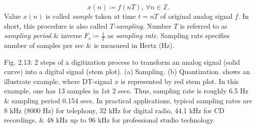 \documentclass{article}
\begin{document}
\begin{itemize}
\begin{itemize}
\begin{itemize}
\begin{itemize}
				\begin{equation*}
					x(n)\coloneqq f(nT),\ \forall n\in\mathbb{Z}.
				\end{equation*}
				Value $x(n)$ is called {\it sample} taken at time $t = nT$ of original analog signal $f$. In short, this procedure is also called {\it$T$-sampling}. Number $T$ is referred to as {\it sampling period} \& inverse $F_s\coloneqq\frac{1}{T}$ as {\it sampling rate}. Sampling rate specifies number of samples per sec \& is measured in Hertz (Hz).
				
				{\sf Fig. 2.13: 2 steps of a digitization process to transform an analog signal (solid curve) into a digital signal (stem plot). (a) Sampling. (b) Quantization.} shows an illustrate example, where DT-signal $x$ is represented by red stem plot. In this example, one has 13 samples in 1st 2 secs. Thus, sampling rate is roughly 6.5 Hz \& sampling period 0.154 secs. In practical applications, typical sampling rates are 8 kHz (8000 Hz) for telephony, 32 kHz for digital radio, 44.1 kHz for CD recordings, \& 48 kHz up to 96 kHz for professional studio technology.
				

\end{itemize}
\end{itemize}
\end{itemize}
\end{itemize}
\end{document}
